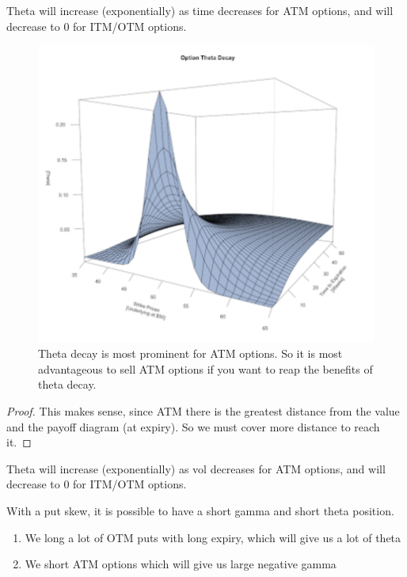 \documentclass{article}
\begin{document}
    \begin{theorem}
      Theta will increase (exponentially) as time decreases for ATM options, and will decrease to $0$ for ITM/OTM options. 
      \begin{figure}[H]
        \centering 
        \includegraphics[scale=0.4]{img/theta_wrt_time.png}
        \caption{Theta decay is most prominent for ATM options. So it is most advantageous to sell ATM options if you want to reap the benefits of theta decay. } 
        \label{fig:theta_wrt_time}
      \end{figure}
    \end{theorem}
    \begin{proof}
      This makes sense, since ATM there is the greatest distance from the value and the payoff diagram (at expiry). So we must cover more distance to reach it. 
    \end{proof}

    \begin{theorem}
      Theta will increase (exponentially) as vol decreases for ATM options, and will decrease to $0$ for ITM/OTM options. 
    \end{theorem}

    \begin{example}
      With a put skew, it is possible to have a short gamma and short theta position.
      \begin{enumerate}
        \item We long a lot of OTM puts with long expiry, which will give us a lot of theta
        \item We short ATM options which will give us large negative gamma
      \end{enumerate}
    \end{example}
\end{document}
